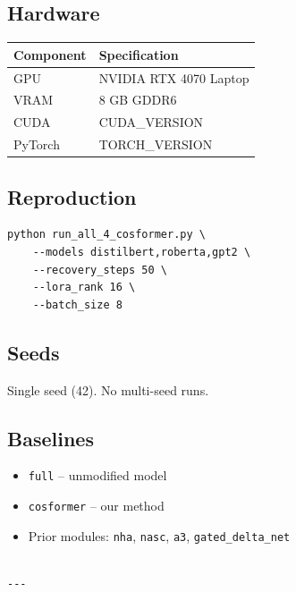 \subsection{Hardware}

\begin{table}[H]
\centering
\small
\begin{tabular}{ll}
\toprule
\textbf{Component} & \textbf{Specification} \\
\midrule
GPU & NVIDIA RTX 4070 Laptop \\
VRAM & 8 GB GDDR6 \\
CUDA & {{CUDA\_VERSION}} \\
PyTorch & {{TORCH\_VERSION}} \\
\bottomrule
\end{tabular}
\end{table}

\subsection{Reproduction}

\begin{lstlisting}
python run_all_4_cosformer.py \
    --models distilbert,roberta,gpt2 \
    --recovery_steps 50 \
    --lora_rank 16 \
    --batch_size 8
\end{lstlisting}

\subsection{Seeds}

Single seed (42). No multi-seed runs.

\subsection{Baselines}

\begin{itemize}
\item \texttt{full} -- unmodified model
\item \texttt{cosformer} -- our method
\item Prior modules: \texttt{nha}, \texttt{nasc}, \texttt{a3}, \texttt{gated\_delta\_net}
\end{itemize}
\begin{lstlisting}

---
\end{lstlisting}